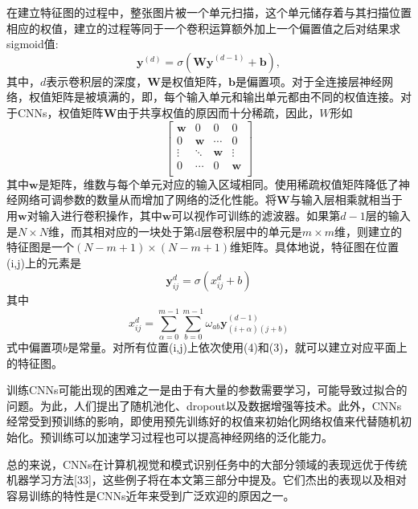 \documentclass[a4paper]{article}
\begin{document}
在建立特征图的过程中，整张图片被一个单元扫描，这个单元储存着与其扫描位置相应的权值，建立的过程等同于一个卷积运算额外加上一个偏置值之后对结果求sigmoid值:\\
\begin{equation}
	\bm{y}^{(d)} = \sigma(\bm{Wy}^{(d-1)}+\bm{b}),
\end{equation}
其中，$d$表示卷积层的深度，$\bm{W}$是权值矩阵，$\bm{b}$是偏置项。对于全连接层神经网络，权值矩阵是被填满的，即，每个输入单元和输出单元都由不同的权值连接。对于CNNs，权值矩阵$\bm{W}$由于共享权值的原因而十分稀疏，因此，${W}$形如
\begin{equation}       %
	\left[                 %
		\begin{array}{cccc}   %
			\bm{w} & 0      & 0      & 0      \\  %
			0      & \bm{w} & \cdots & 0      \\  %
			\vdots & \ddots & \bm{w} & \vdots \\  %
			0      & \cdots & 0      & \bm{w} \\  %
		\end{array}
		\right]                %
\end{equation}
其中$\bm{w}$是矩阵，维数与每个单元对应的输入区域相同。使用稀疏权值矩阵降低了神经网络可调参数的数量从而增加了网络的泛化性能。将$\bm{W}$与输入层相乘就相当于用$\bm{w}$对输入进行卷积操作，其中$\bm{w}$可以视作可训练的滤波器。如果第$d-1$层的输入是$N\times N$维，而其相对应的一块处于第d层卷积层中的单元是$m\times m$维，则建立的特征图是一个$(N-m+1)\times(N-m+1)$维矩阵。具体地说，特征图在位置(i,j)上的元素是
\begin{equation}
	\bm{y}^{d}_{ij}=\sigma(x^{d}_{ij} + b)
\end{equation}
其中
\begin{equation}
	x^{d}_{ij} = \sum_{\alpha=0}^{m-1}\sum_{b=0}^{m-1}\omega_{ab}\bm{y}^{(d-1)}_{(i+\alpha)(j+b)}
\end{equation}
式中偏置项$b$是常量。对所有位置(i,j)上依次使用(4)和(3)，就可以建立对应平面上的特征图。

训练CNNs可能出现的困难之一是由于有大量的参数需要学习，可能导致过拟合的问题。为此，人们提出了随机池化、dropout以及数据增强等技术。此外，CNNs经常受到预训练的影响，即使用预先训练好的权值来初始化网络权值来代替随机初始化。预训练可以加速学习过程也可以提高神经网络的泛化能力。

总的来说，CNNs在计算机视觉和模式识别任务中的大部分领域的表现远优于传统机器学习方法[33]，这些例子将在本文第三部分中提及。它们杰出的表现以及相对容易训练的特性是CNNs近年来受到广泛欢迎的原因之一。
\end{document}
